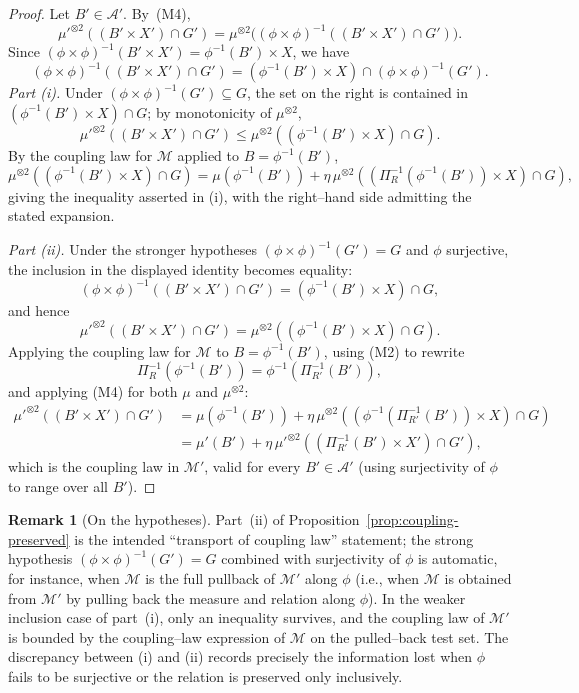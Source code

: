 \documentclass[11pt]{article}
\numberwithin{equation}{section}
\theoremstyle{definition}
\newtheorem{remark}[theorem]{Remark}
\begin{document}
\begin{proof}
Let $B'\in\mathcal A'$. By~(M4),
\[
\mu'^{\otimes2}((B'\times X')\cap G')=\mu^{\otimes2}\bigl((\phi\times\phi)^{-1}((B'\times X')\cap G')\bigr).
\]
Since $(\phi\times\phi)^{-1}(B'\times X')=\phi^{-1}(B')\times X$, we have
\[
(\phi\times\phi)^{-1}((B'\times X')\cap G')=(\phi^{-1}(B')\times X)\cap(\phi\times\phi)^{-1}(G').
\]
\emph{Part (i).} Under $(\phi\times\phi)^{-1}(G')\subseteq G$, the set on the right is contained in $(\phi^{-1}(B')\times X)\cap G$; by monotonicity of $\mu^{\otimes2}$,
\[
\mu'^{\otimes2}((B'\times X')\cap G')\le\mu^{\otimes2}((\phi^{-1}(B')\times X)\cap G).
\]
By the coupling law for $\mathcal M$ applied to $B=\phi^{-1}(B')$,
\[
\mu^{\otimes2}((\phi^{-1}(B')\times X)\cap G)=\mu(\phi^{-1}(B'))+\eta\,\mu^{\otimes2}((\Pi_R^{-1}(\phi^{-1}(B'))\times X)\cap G),
\]
giving the inequality asserted in (i), with the right--hand side admitting the stated expansion.

\emph{Part (ii).} Under the stronger hypotheses $(\phi\times\phi)^{-1}(G')=G$ and $\phi$ surjective, the inclusion in the displayed identity becomes equality:
\[
(\phi\times\phi)^{-1}((B'\times X')\cap G')=(\phi^{-1}(B')\times X)\cap G,
\]
and hence
\[
\mu'^{\otimes2}((B'\times X')\cap G')=\mu^{\otimes2}((\phi^{-1}(B')\times X)\cap G).
\]
Applying the coupling law for $\mathcal M$ to $B=\phi^{-1}(B')$, using (M2) to rewrite
\[
\Pi_R^{-1}(\phi^{-1}(B'))=\phi^{-1}(\Pi_{R'}^{-1}(B')),
\]
and applying (M4) for both $\mu$ and $\mu^{\otimes2}$:
\begin{align*}
\mu'^{\otimes2}((B'\times X')\cap G')
&=\mu(\phi^{-1}(B'))+\eta\,\mu^{\otimes2}((\phi^{-1}(\Pi_{R'}^{-1}(B'))\times X)\cap G)\\
&=\mu'(B')+\eta\,\mu'^{\otimes2}((\Pi_{R'}^{-1}(B')\times X')\cap G'),
\end{align*}
which is the coupling law in $\mathcal M'$, valid for every $B'\in\mathcal A'$ (using surjectivity of $\phi$ to range over all $B'$).
\end{proof}

\begin{remark}[On the hypotheses]\label{rem:surjectivity}
Part~(ii) of Proposition~\ref{prop:coupling-preserved} is the intended ``transport of coupling law'' statement; the strong hypothesis $(\phi\times\phi)^{-1}(G')=G$ combined with surjectivity of $\phi$ is automatic, for instance, when $\mathcal M$ is the full pullback of $\mathcal M'$ along $\phi$ (i.e., when $\mathcal M$ is obtained from $\mathcal M'$ by pulling back the measure and relation along $\phi$). In the weaker inclusion case of part~(i), only an inequality survives, and the coupling law of $\mathcal M'$ is bounded by the coupling--law expression of $\mathcal M$ on the pulled--back test set. The discrepancy between (i) and (ii) records precisely the information lost when $\phi$ fails to be surjective or the relation is preserved only inclusively.
\end{remark}
\end{document}
